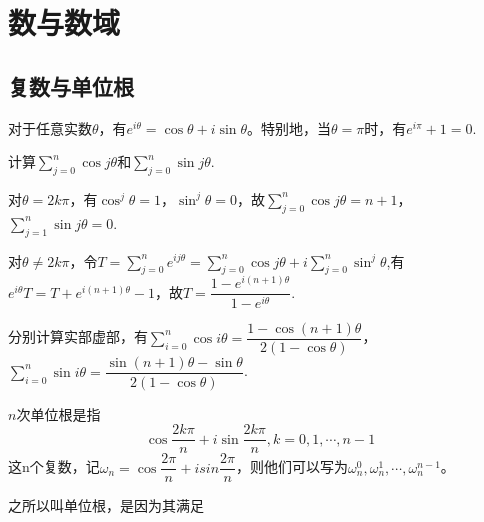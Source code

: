     \section{数与数域}

        \subsection{复数与单位根}

            \begin{theorem}[Euler]
                对于任意实数$\theta$，有$e^{i\theta}=\cos\theta+i\sin\theta$。特别地，当$\theta=\pi$时，有$e^{i\pi}+1=0$.
            \end{theorem}

            \begin{example}
                计算$\sum\limits_{j=0}^n\cos j\theta$和$\sum\limits_{j=0}^n\sin j\theta$.
            \end{example}

            \begin{solution}
                对$\theta =2k\pi$，有$\cos^{j}\theta = 1$，$\sin^{j}\theta = 0$，故$\sum\limits_{j=0}^n\cos j\theta = n+1$，$\sum\limits_{j=1}^n\sin j\theta = 0$.

                对$\theta \neq 2k\pi$，令$T=\sum\limits_{j=0}^{n}e^{ij\theta}=\sum\limits_{j=0}^n\cos j\theta+i\sum\limits_{j=0}^n\sin^{j}\theta$,有$e^{i\theta}T=T+e^{i(n+1)\theta}-1$，故$T=\dfrac{1-e^{i(n+1)\theta}}{1-e^{i\theta}}$.

                分别计算实部虚部，有$\sum\limits_{i=0}^n\cos i\theta = \dfrac{1-\cos(n+1)\theta}{2(1-\cos\theta)}$，$\sum\limits_{i=0}^n\sin i\theta = \dfrac{\sin (n+1)\theta-\sin \theta}{2(1-\cos\theta)}$.
            \end{solution}

            \begin{definition}
                $n$次单位根是指
                \begin{equation}
                    \label{eq:unit_root}
                    \cos\frac{2k\pi}n+i\sin\frac{2k\pi}n, k=0,1,\cdots,n-1
                    \nonumber
                \end{equation}
                这n个复数，记$\omega_n=\cos\dfrac{2\pi}n+isin\dfrac{2\pi}n$，则他们可以写为$\omega_n^{0},\omega_n^{1},\cdots,\omega_n^{n-1}$。
            \end{definition}

            之所以叫单位根，是因为其满足

